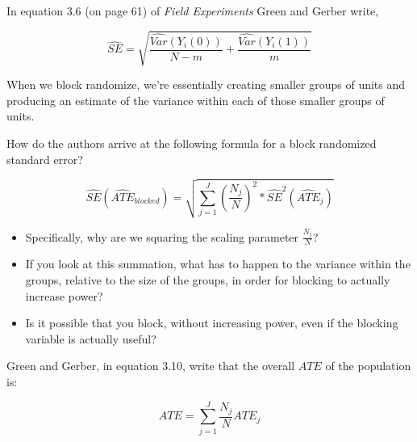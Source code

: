 \documentclass[
]{article}
\providecommand{\tightlist}{%
  \setlength{\itemsep}{0pt}\setlength{\parskip}{0pt}}
\theoremstyle{definition}
\theoremstyle{definition}
\theoremstyle{definition}
\theoremstyle{definition}
\theoremstyle{remark}
\begin{document}
In equation 3.6 (on page 61) of \emph{Field Experiments} Green and Gerber write,

\[ 
  \widehat{SE} = \sqrt{\frac{\widehat{Var}(Y_{i}(0))}{N-m} + \frac{\widehat{Var}(Y_{i}(1))}{m}}
\]

When we block randomize, we're essentially creating smaller groups of units and producing an estimate of the variance within each of those smaller groups of units.

How do the authors arrive at the following formula for a block randomized standard error?

\[ 
  \widehat{SE}(\widehat{ATE}_{blocked}) = \sqrt{\sum_{j=1}^{J}\left(\frac{N_{j}}{N}\right)^2 * \widehat{SE}^2(\widehat{ATE}_{j})}
\]

\begin{itemize}
\tightlist
\item
  Specifically, why are we squaring the scaling parameter \(\frac{N_{j}}{N}\)?
\item
  If you look at this summation, what has to happen to the variance within the groups, relative to the size of the groups, in order for blocking to actually increase power?
\item
  Is it possible that you block, without increasing power, even if the blocking variable is actually useful?
\end{itemize}

Green and Gerber, in equation 3.10, write that the overall \(ATE\) of the population is:

\[ 
  ATE = \sum_{j=1}^{J} \frac{N_{j}}{N} ATE_{j}
\]
\end{document}
